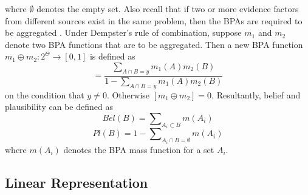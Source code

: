 \documentclass[12pt]{uthesis-v12}  %
\begin{document}
\noindent where $\emptyset$ denotes the empty set. Also recall that if two or more evidence factors from different sources exist in the same problem, then the BPAs are required to be aggregated \cite{auer}. Under Dempster's rule of combination, suppose $m_1$ and $m_2$ denote two BPA functions that are to be aggregated. Then a new BPA function $m_1 \oplus m_2 : 2^\Theta \rightarrow [0,1]$ is defined as \cite{al-ani}
\begin{equation}
[m_1 \oplus m_2] = \frac{\sum\nolimits_{A\cap B = y} m_1(A)m_2(B)}{1-\sum\nolimits_{A\cap B = y} m_1(A)m_2(B)}
\label{agg}
\end{equation}
on the condition that $y \neq 0$. Otherwise $[m_1 \oplus m_2] = 0$. Resultantly, belief and plausibility can be defined as
\begin{equation}
Bel(B) = \sum\nolimits_{A_i \subset B} m(A_i)
\label{bel1}
\end{equation}
\begin{equation}
Pl(B) = 1 - \sum\nolimits_{A_i \cap B = \emptyset} m(A_i)
\label{pl1}
\end{equation}
where $m(A_i)$ denotes the BPA mass function for a set $A_i$.

\subsection{Linear Representation}
\end{document}
